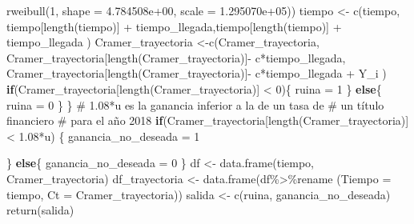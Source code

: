 \documentclass[
  us-letterpaper,
]{scrreprt}
\newenvironment{Shaded}{\begin{snugshade}}{\end{snugshade}}
\newcommand{\AttributeTok}[1]{\textcolor[rgb]{0.40,0.45,0.13}{#1}}
\newcommand{\CommentTok}[1]{\textcolor[rgb]{0.37,0.37,0.37}{#1}}
\newcommand{\ControlFlowTok}[1]{\textcolor[rgb]{0.00,0.23,0.31}{\textbf{#1}}}
\newcommand{\DecValTok}[1]{\textcolor[rgb]{0.68,0.00,0.00}{#1}}
\newcommand{\FloatTok}[1]{\textcolor[rgb]{0.68,0.00,0.00}{#1}}
\newcommand{\FunctionTok}[1]{\textcolor[rgb]{0.28,0.35,0.67}{#1}}
\newcommand{\NormalTok}[1]{\textcolor[rgb]{0.00,0.23,0.31}{#1}}
\newcommand{\OtherTok}[1]{\textcolor[rgb]{0.00,0.23,0.31}{#1}}
\newcommand{\SpecialCharTok}[1]{\textcolor[rgb]{0.37,0.37,0.37}{#1}}
\theoremstyle{plain}
\theoremstyle{plain}
\theoremstyle{definition}
\theoremstyle{remark}
\begin{document}
\begin{Shaded}
\begin{Highlighting}[]
             \FunctionTok{rweibull}\NormalTok{(}\DecValTok{1}\NormalTok{,  }\AttributeTok{shape =} \FloatTok{4.784508e+00}\NormalTok{, }\AttributeTok{scale =} \FloatTok{1.295070e+05}\NormalTok{)) }
\NormalTok{    tiempo }\OtherTok{\textless{}{-}} \FunctionTok{c}\NormalTok{(tiempo, tiempo[}\FunctionTok{length}\NormalTok{(tiempo)] }\SpecialCharTok{+}
\NormalTok{                  tiempo\_llegada,tiempo[}\FunctionTok{length}\NormalTok{(tiempo)] }\SpecialCharTok{+} 
\NormalTok{                  tiempo\_llegada ) }
\NormalTok{    Cramer\_trayectoria }\OtherTok{\textless{}{-}}\FunctionTok{c}\NormalTok{(Cramer\_trayectoria,}
\NormalTok{                Cramer\_trayectoria[}\FunctionTok{length}\NormalTok{(Cramer\_trayectoria)]}\SpecialCharTok{{-}}
\NormalTok{                  c}\SpecialCharTok{*}\NormalTok{tiempo\_llegada,}
\NormalTok{                Cramer\_trayectoria[}\FunctionTok{length}\NormalTok{(Cramer\_trayectoria)]}\SpecialCharTok{{-}}
\NormalTok{                  c}\SpecialCharTok{*}\NormalTok{tiempo\_llegada }\SpecialCharTok{+}\NormalTok{  Y\_i )}
    \ControlFlowTok{if}\NormalTok{(Cramer\_trayectoria[}\FunctionTok{length}\NormalTok{(Cramer\_trayectoria)] }\SpecialCharTok{\textless{}} \DecValTok{0}\NormalTok{)\{}
\NormalTok{      ruina }\OtherTok{=} \DecValTok{1}
\NormalTok{    \}}
    \ControlFlowTok{else}\NormalTok{\{}
\NormalTok{      ruina }\OtherTok{=} \DecValTok{0}
\NormalTok{    \}}
\NormalTok{  \}}
\CommentTok{\# 1.08*u es la ganancia inferior a la de un tasa de }
\CommentTok{\# un título financiero }
\CommentTok{\# para el año 2018}
  \ControlFlowTok{if}\NormalTok{(Cramer\_trayectoria[}\FunctionTok{length}\NormalTok{(Cramer\_trayectoria)] }\SpecialCharTok{\textless{}} \FloatTok{1.08}\SpecialCharTok{*}\NormalTok{u) \{}
\NormalTok{    ganancia\_no\_deseada }\OtherTok{=} \DecValTok{1}
    
\NormalTok{  \} }
  \ControlFlowTok{else}\NormalTok{\{}
\NormalTok{    ganancia\_no\_deseada }\OtherTok{=} \DecValTok{0}
\NormalTok{  \}}
\NormalTok{  df }\OtherTok{\textless{}{-}} \FunctionTok{data.frame}\NormalTok{(tiempo, Cramer\_trayectoria)}
\NormalTok{  df\_trayectoria }\OtherTok{\textless{}{-}} \FunctionTok{data.frame}\NormalTok{(df}\SpecialCharTok{\%\textgreater{}\%}\NormalTok{rename}
\NormalTok{                               (}\AttributeTok{Tiempo =}\NormalTok{ tiempo, }
                                \AttributeTok{Ct =}\NormalTok{ Cramer\_trayectoria))}
\NormalTok{  salida }\OtherTok{\textless{}{-}} \FunctionTok{c}\NormalTok{(ruina, ganancia\_no\_deseada)}
  \FunctionTok{return}\NormalTok{(salida)}
  

\end{Highlighting}
\end{Shaded}
\end{document}

